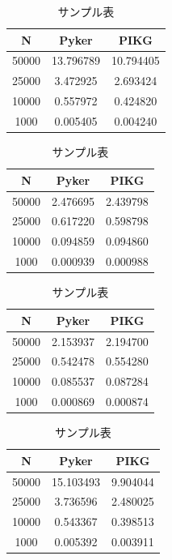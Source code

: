 \documentclass{jarticle}
\begin{document}
\begin{table}[ht]
  \centering %
  \caption{サンプル表} %
  \label{tab:sampleTable}
  \begin{tabular}{ccc} %
  \toprule
  N & Pyker & PIKG \\
  \midrule
  50000 & 13.796789& 10.794405\\
  25000 & 3.472925 & 2.693424\\
  10000 & 0.557972 & 0.424820\\
  1000 & 0.005405& 0.004240\\
\bottomrule
\end{tabular}
\end{table}



\begin{table}[ht]
  \centering %
  \caption{サンプル表} %
  \label{tab:sampleTable}
  \begin{tabular}{ccc} %
  \toprule
  N & Pyker & PIKG \\
  \midrule
  50000 & 2.476695 & 2.439798\\
  25000 & 0.617220 & 0.598798\\
  10000 & 0.094859 & 0.094860\\
  1000 & 0.000939& 0.000988\\
\bottomrule
\end{tabular}
\end{table}


\begin{table}[ht]
  \centering %
  \caption{サンプル表} %
  \label{tab:sampleTable}
  \begin{tabular}{ccc} %
  \toprule
  N & Pyker & PIKG \\
  \midrule
  50000 & 2.153937 & 2.194700\\
  25000 &0.542478 & 0.554280\\
  10000 & 0.085537 &0.087284\\
  1000 & 0.000869&0.000874\\
\bottomrule
\end{tabular}
\end{table}

\begin{table}[ht]
  \centering %
  \caption{サンプル表} %
  \label{tab:sampleTable}
  \begin{tabular}{ccc} %
  \toprule
  N & Pyker & PIKG \\
  \midrule
  50000 & 15.103493& 9.904044\\
  25000 &3.736596 & 2.480025\\
  10000 &0.543367 &0.398513\\
  1000 & 0.005392&0.003911\\
\bottomrule
\end{tabular}
\end{table} 
\end{document}
